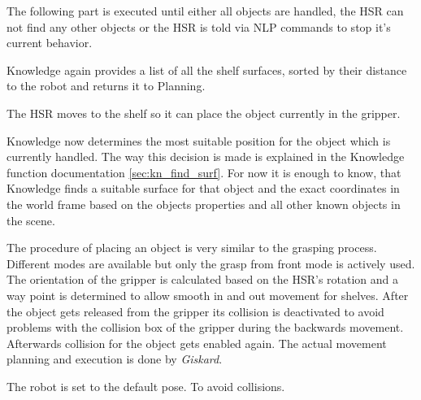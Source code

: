 \documentclass[main.tex]{subfiles}
\begin{document}
	\begin{planning}
	The following part is executed until either all objects are handled, the HSR can not find any other objects or the HSR is told via NLP commands to stop it's current behavior.
	\end{planning}
	
	\begin{knowledge}
	Knowledge again provides a list of all the shelf surfaces, sorted by their distance to the robot and returns it to Planning.
	\end{knowledge}
	
	\begin{navigation}
	The HSR moves to the shelf so it can place the object currently in the gripper.
	\end{navigation}
	
	\begin{knowledge}
	Knowledge now determines the most suitable position for the object which is currently handled. The way this decision is made is explained in the Knowledge function documentation \ref{sec:kn_find_surf}. For now it is enough to know, that Knowledge finds a suitable surface for that object and the exact coordinates in the world frame based on the objects properties and all other known objects in the scene.
	\end{knowledge}
	
	\begin{manipulation}
	The procedure of placing an object is very similar to the grasping process. Different modes are available but only the grasp from front mode is actively used. The orientation of the gripper is calculated based on the HSR's rotation and a way point is determined to allow smooth in and  out movement for shelves. After the object gets released from the gripper its collision is deactivated to avoid problems with the collision box of the gripper during the backwards movement. Afterwards collision for the object gets enabled again. The actual movement planning and execution is done by \textit{Giskard}.   	
	\end{manipulation}
	
	
	\begin{manipulation}
	The robot is set to the default pose. To avoid collisions.
	\end{manipulation}
	
\end{document}
